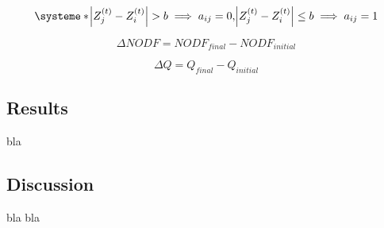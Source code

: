 \documentclass[a4paper, 12pt]{article}
\begin{document}
\begin{equation} \label{eq:11}
  \systeme*{\abs{Z^{(t)}_{j} - Z^{(t)}_{i}} > b \implies a_{ij} = 0,\abs{Z^{(t)}_{j} - Z^{(t)}_{i}} \leq b \implies a_{ij} = 1}
\end{equation}

\begin{equation} \label{eq:12}
\Delta NODF = NODF_{final} - NODF_{initial}
\end{equation}

\begin{equation} \label{eq:13}
\Delta Q = Q_{final} - Q_{initial}
\end{equation}

\subsection*{Results}
bla

\subsection*{Discussion}
bla bla

\end{document}
